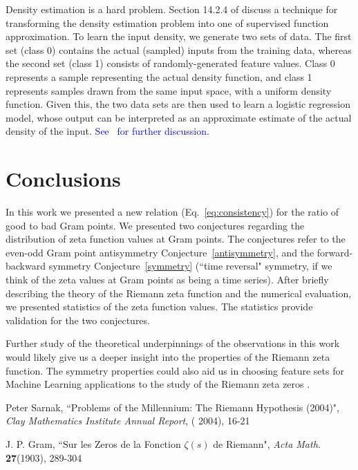 \documentclass[twoside]{article}
\theoremstyle{definition}
\begin{document}
{Density estimation is a hard problem. Section 14.2.4 of \cite{Friedman(2001)}  discuss a technique for transforming the density estimation problem into one of supervised function approximation. To learn the input density, we generate two sets of data. The first set (class 0) contains the actual (sampled) inputs from the training data, whereas the second set (class 1) consists of randomly-generated feature values. Class 0 represents a sample representing the actual density function, and class 1 represents samples drawn from the same input space, with a uniform density function. Given this, the two data sets are then used to learn a logistic regression model, whose output can be interpreted as an approximate estimate of the actual density of the input. \textcolor{blue}{See~\cite{Friedman(2001)} for further discussion. }     

\section{\label{conclusions}Conclusions}

In this work we presented a new  relation (Eq.~\ref{eq:consistency}) for the ratio of good to bad Gram points. We presented two conjectures regarding the distribution of zeta function values at Gram points. The conjectures refer to the even-odd Gram point antisymmetry Conjecture~\ref{antisymmetry}, and the forward-backward symmetry Conjecture~\ref{symmetry} (``time reversal" symmetry, if we think of the zeta values at Gram points as being a time series). After briefly describing the theory of the Riemann zeta function and the numerical evaluation, we presented statistics of the zeta function values. The statistics provide validation for the two conjectures.

Further study of the theoretical underpinnings of the observations in this work would likely give us a deeper insight into the properties of the Riemann zeta function. The symmetry properties could also aid us in choosing feature sets for Machine Learning applications to the study of the Riemann zeta zeros \cite{osneural,osentropy}.

\begin{thebibliography} {}

 Peter Sarnak,
``Problems of the Millennium: The Riemann Hypothesis (2004)",  {\it Clay Mathematics Institute Annual Report}, ( 2004), 
16-21

 J. P. Gram, 
``Sur les Zeros de la Fonction  $\zeta ( s )$  de Riemann",
{\it Acta Math.} {\bf27}(1903), 289-304


\end{thebibliography}}
\end{document}
